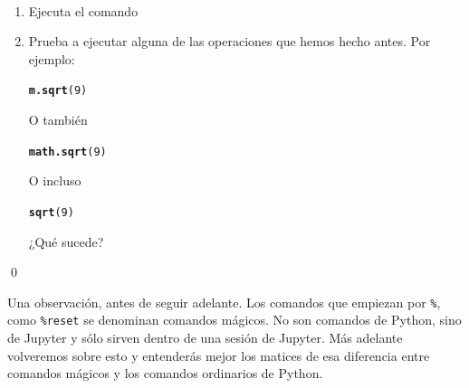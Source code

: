 \documentclass[10pt,a4paper]{article}\usepackage[]{graphicx}\usepackage[]{color}
\makeatletter
\newcommand{\hlnum}[1]{\textcolor[rgb]{0.686,0.059,0.569}{#1}}%
\newcommand{\hlstd}[1]{\textcolor[rgb]{0.345,0.345,0.345}{#1}}%
\newcommand{\hlkwd}[1]{\textcolor[rgb]{0.737,0.353,0.396}{\textbf{#1}}}%
\newenvironment{kframe}{%
 \def\at@end@of@kframe{}%
 \ifinner\ifhmode%
  \def\at@end@of@kframe{\end{minipage}}%
  \begin{minipage}{\columnwidth}%
 \fi\fi%
 \def\FrameCommand##1{\hskip\@totalleftmargin \hskip-\fboxsep
 \colorbox{shadecolor}{##1}\hskip-\fboxsep
     \hskip-\linewidth \hskip-\@totalleftmargin \hskip\columnwidth}%
 \MakeFramed {\advance\hsize-\width
   \@totalleftmargin\z@ \linewidth\hsize
   \@setminipage}}%
 {\par\unskip\endMakeFramed%
 \at@end@of@kframe}
\newenvironment{knitrout}{}{} %
\makeatother
\begin{document}
\begin{ejercicio}
\label{tut02:ejercicio06}
\quad\\
\begin{enumerate}
\item Ejecuta el comando
\begin{knitrout}
\color{fgcolor}\begin{kframe}
\begin{alltt}
\end{alltt}
\end{kframe}
\end{knitrout}
\item Prueba a ejecutar alguna de las operaciones que hemos hecho antes. Por ejemplo:
\begin{knitrout}
\color{fgcolor}\begin{kframe}
\begin{alltt}
\hlkwd{m.sqrt}\hlstd{(}\hlnum{9}\hlstd{)}
\end{alltt}
\end{kframe}
\end{knitrout}
O también
\begin{knitrout}
\color{fgcolor}\begin{kframe}
\begin{alltt}
\hlkwd{math.sqrt}\hlstd{(}\hlnum{9}\hlstd{)}
\end{alltt}
\end{kframe}
\end{knitrout}
O incluso
\begin{knitrout}
\color{fgcolor}\begin{kframe}
\begin{alltt}
\hlkwd{sqrt}\hlstd{(}\hlnum{9}\hlstd{)}
\end{alltt}
\end{kframe}
\end{knitrout}
¿Qué sucede?
\end{enumerate}
\qed
\end{ejercicio}

Una observación, antes de seguir adelante. Los comandos que empiezan por \verb#%#,
como \verb#%reset#
se denominan {\sf comandos mágicos}. No son comandos de Python, sino de Jupyter y sólo sirven dentro de una sesión de Jupyter. Más adelante volveremos sobre esto y entenderás mejor los matices de esa diferencia entre comandos mágicos y los comandos ordinarios de Python.
\end{document}
